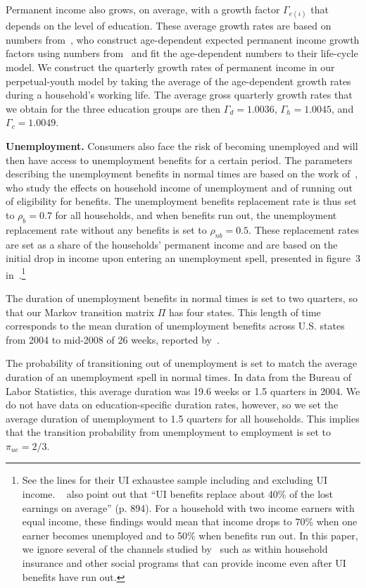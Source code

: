 \documentclass{econsocart}
\begin{document}
Permanent income also grows, on average, with a growth factor $\Gamma_{e(i)}$ that depends on the level of education.
These average growth rates are based on numbers from~\cite{carroll2020modeling}, who construct age-dependent expected permanent income growth factors using numbers from~\cite{cagetti2003wealth} and fit the age-dependent numbers to their life-cycle model.
We construct the quarterly growth rates of permanent income in our perpetual-youth model by taking the average of the age-dependent growth rates during a household's working life.
The average gross quarterly growth rates that we obtain for the three education groups are then $\Gamma_d=1.0036$, $\Gamma_h=1.0045$, and $\Gamma_c=1.0049$.

\textbf{Unemployment.} Consumers also face the risk of becoming unemployed and will then have access to unemployment benefits for a certain period.
The parameters describing the unemployment benefits in normal times are based on the work of~\cite{rothstein2017scraping}, who study the effects on household income of unemployment and of running out of eligibility for benefits.
The unemployment benefits replacement rate is thus set to $\rho_b=0.7$ for all households, and when benefits run out, the unemployment replacement rate without any benefits is set to $\rho_{nb}=0.5$.
These replacement rates are set as a share of the households' permanent income and are based on the initial drop in income upon entering an unemployment spell, presented in figure~3 in~\cite{rothstein2017scraping}.\footnote{See the lines for their UI exhaustee sample including and excluding UI income.
  ~\cite{rothstein2017scraping} also point out that ``UI benefits replace about 40\% of the lost earnings on average'' (p. 894).
  For a household with two income earners with equal income, these findings would mean that income drops to 70\% when one earner becomes unemployed and to 50\% when benefits run out.
  In this paper, we ignore several of the channels studied by~\cite{rothstein2017scraping} such as within household insurance and other social programs that can provide income even after UI benefits have run out.}

The duration of unemployment benefits in normal times is set to two quarters, so that our Markov transition matrix $\Pi$ has four states.
This length of time corresponds to the mean duration of unemployment benefits across U.S.
states from 2004 to mid-2008 of 26 weeks, reported by~\cite{rothstein2017scraping}.

The probability of transitioning out of unemployment is set to match the average duration of an unemployment spell in normal times.
In data from the Bureau of Labor Statistics, this average duration was 19.6 weeks or 1.5 quarters in 2004. We do not have data on  education-specific duration rates, however, so we set the average duration of unemployment to 1.5 quarters for all households. This implies that the transition probability from unemployment to employment is set to $\pi_{ue}=2/3$.
\end{document}
